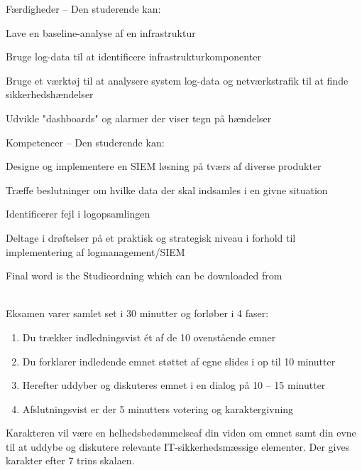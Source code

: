 \documentclass[Screen16to9,17pt]{foils}
\begin{document}
Færdigheder -- Den studerende kan:
\begin{list2}
\item Lave en baseline-analyse af en infrastruktur
\item Bruge log-data til at identificere infrastrukturkomponenter
\item Bruge et værktøj til at analysere system log-data og netværkstrafik til at finde sikkerhedshændelser
\item Udvikle "dashboards" og alarmer der viser tegn på hændelser
\end{list2}

Kompetencer -- Den studerende kan:
\begin{list2}
\item Designe og implementere en SIEM løsning på tværs af diverse produkter
\item Træffe beslutninger om hvilke data der skal indsamles i en givne situation
\item Identificerer fejl i logopsamlingen
\item Deltage i drøftelser på et praktisk og strategisk niveau i forhold til implementering af
logmanagement/SIEM
\end{list2}

Final word is the Studieordning which can be downloaded from\\
{\footnotesize {}\\
}




Eksamen varer samlet set i 30 minutter og forløber i 4 faser:

\begin{enumerate}
  \item Du trækker indledningsvist ét af de 10 ovenstående emner
  \item Du forklarer indledende emnet støttet af egne slides i op til 10 minutter
  \item Herefter uddyber og diskuteres emnet i en dialog på 10 -- 15 minutter
  \item Afslutningsvist er der 5 minutters votering og karaktergivning
\end{enumerate}

Karakteren vil være en helhedsbedømmelseaf din viden om emnet samt din evne til at uddybe og diskutere relevante IT-sikkerhedsmæssige elementer. Der gives karakter efter 7 trins skalaen.
\end{document}
